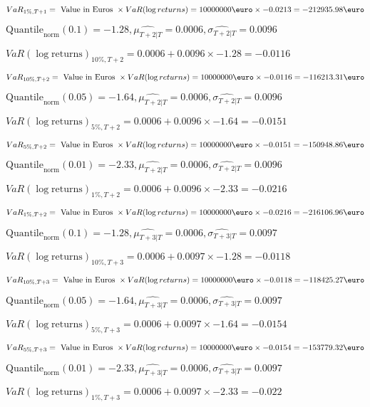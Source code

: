 $VaR_{1\%, T + 1} = \text{ Value in Euros } \times VaR(\log returns) = 10 000 000 \text{\euro} \times-0.0213 = -212935.98 \text{\euro}$


$\text{Quantile}_\text{norm}(0.1) = -1.28,\hat{\mu_{T+2|T}} = 0.0006, \hat{\sigma_{T+2|T}} = 0.0096$

$VaR(\log \text{returns})_{10\%, T + 2} = 0.0006 + 0.0096\times-1.28 = -0.0116$

$VaR_{10\%, T + 2} = \text{ Value in Euros } \times VaR(\log returns) = 10 000 000 \text{\euro} \times-0.0116 = -116213.31 \text{\euro}$


$\text{Quantile}_\text{norm}(0.05) = -1.64,\hat{\mu_{T+2|T}} = 0.0006, \hat{\sigma_{T+2|T}} = 0.0096$

$VaR(\log \text{returns})_{5\%, T + 2} = 0.0006 + 0.0096\times-1.64 = -0.0151$

$VaR_{5\%, T + 2} = \text{ Value in Euros } \times VaR(\log returns) = 10 000 000 \text{\euro} \times-0.0151 = -150948.86 \text{\euro}$


$\text{Quantile}_\text{norm}(0.01) = -2.33,\hat{\mu_{T+2|T}} = 0.0006, \hat{\sigma_{T+2|T}} = 0.0096$

$VaR(\log \text{returns})_{1\%, T + 2} = 0.0006 + 0.0096\times-2.33 = -0.0216$

$VaR_{1\%, T + 2} = \text{ Value in Euros } \times VaR(\log returns) = 10 000 000 \text{\euro} \times-0.0216 = -216106.96 \text{\euro}$


$\text{Quantile}_\text{norm}(0.1) = -1.28,\hat{\mu_{T+3|T}} = 0.0006, \hat{\sigma_{T+3|T}} = 0.0097$

$VaR(\log \text{returns})_{10\%, T + 3} = 0.0006 + 0.0097\times-1.28 = -0.0118$

$VaR_{10\%, T + 3} = \text{ Value in Euros } \times VaR(\log returns) = 10 000 000 \text{\euro} \times-0.0118 = -118425.27 \text{\euro}$


$\text{Quantile}_\text{norm}(0.05) = -1.64,\hat{\mu_{T+3|T}} = 0.0006, \hat{\sigma_{T+3|T}} = 0.0097$

$VaR(\log \text{returns})_{5\%, T + 3} = 0.0006 + 0.0097\times-1.64 = -0.0154$

$VaR_{5\%, T + 3} = \text{ Value in Euros } \times VaR(\log returns) = 10 000 000 \text{\euro} \times-0.0154 = -153779.32 \text{\euro}$


$\text{Quantile}_\text{norm}(0.01) = -2.33,\hat{\mu_{T+3|T}} = 0.0006, \hat{\sigma_{T+3|T}} = 0.0097$

$VaR(\log \text{returns})_{1\%, T + 3} = 0.0006 + 0.0097\times-2.33 = -0.022$

